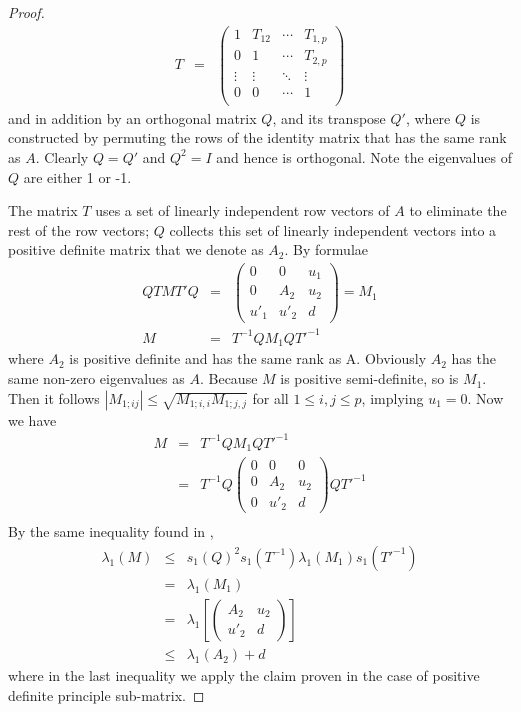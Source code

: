 \documentclass{article}
\begin{document}
\begin{proof}
\begin{eqnarray*}
    T &=& 
    \begin{pmatrix}
      1 & T_{12} & \cdots & T_{1,p} \\
      0 & 1 & \cdots & T_{2, p} \\
      \vdots & \vdots & \ddots & \vdots \\
      0 & 0 & \cdots & 1 \\
    \end{pmatrix}
  \end{eqnarray*}
  and in addition by an orthogonal matrix $Q$, and its transpose $Q'$,
  where $Q$ is constructed by permuting the rows of the identity
  matrix that has the same rank as $A$. Clearly $Q=Q'$ and $Q^2 = I$
  and hence is orthogonal. Note the eigenvalues of $Q$ are either 1 or
  -1.

  The matrix $T$ uses a set of linearly independent row vectors of $A$
  to eliminate the rest of the row vectors; $Q$ collects this set of
  linearly independent vectors into a positive definite matrix that we
  denote as $A_2$. By formulae
  \begin{eqnarray*}
    QTMT'Q &=&
    \begin{pmatrix}
      0 & 0 & u_1 \\
      0 & A_2 & u_2 \\
      u'_1 & u'_2 & d
    \end{pmatrix} = M_1 \\
    M  &=& T^{-1} Q M_1 Q T'^{-1}
  \end{eqnarray*}
  where $A_2$ is positive definite and has the same rank as
  A. Obviously $A_2$ has the same non-zero eigenvalues as $A$.
  Because $M$ is positive semi-definite, so is $M_1$. Then it follows
  $|M_{1;ij}| \leq \sqrt{M_{1;i,i} M_{1;j,j}}$ for all $1 \leq i,j
  \leq p$, implying $u_1 = 0$. Now we have
  \begin{eqnarray*}
    M &=& T^{-1} Q M_1 Q T'^{-1} \\
    &=& T^{-1} Q
    \begin{pmatrix}
      0 & 0 & 0 \\
      0 & A_2 & u_2 \\
      0 & u'_2 & d
    \end{pmatrix} Q T'^{-1} \\
  \end{eqnarray*}
  By the same inequality found in \cite{BaiSilverstein2010},
  \begin{eqnarray*}
    \lambda_1(M) &\leq& s_1(Q)^2 s_1(T^{-1}) \lambda_1(M_1)
    s_1(T'^{-1}) \\
    &=& \lambda_1(M_1) \\
    &=& \lambda_1 \left[\left(
      \begin{array}{cc}
        A_2 & u_2 \\
        u'_2 & d
      \end{array} \right)\right] \\
  &\leq& \lambda_1(A_2) + d
  \end{eqnarray*}
  where in the last inequality we apply the claim proven in the case
  of positive definite principle sub-matrix.
\end{proof}
\end{document}
